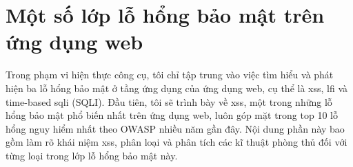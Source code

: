 \chapter{Một số lớp lỗ hổng bảo mật trên ứng dụng web}
Trong phạm vi hiện thực công cụ, tôi chỉ tập trung vào việc tìm hiểu và phát hiện ba lỗ hổng bảo mật ở tầng ứng dụng của ứng dụng web, cụ thể là \acrfull{xss}, \acrfull{lfi} và time-based \acrlong{sqli} (SQLI). Đầu tiên, tôi sẽ trình bày về \acrfull{xss}, một trong những lỗ hổng bảo mật phổ biến nhất trên ứng dụng web, luôn góp mặt trong top 10 lỗ hổng nguy hiểm nhất theo OWASP \parencite{owasp-top-10} nhiều năm gần đây. Nội dung phần này bao gồm làm rõ khái niệm \acrshort{xss}, phân loại và phân tích các kĩ thuật phòng thủ đối với từng loại trong lớp lỗ hổng bảo mật này.
